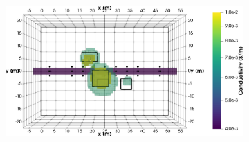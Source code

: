 \documentclass[preprint,authoryear,12pt]{elsarticle}
\begin{document}
\begin{figure}[htp]{}
\begin{center}
\begin{subfigure}{0.55\linewidth}
      \end{subfigure}
      \hspace{-4.0cm}
      \qquad
      \begin{subfigure}{0.55\linewidth}
         \includegraphics[trim=0cm 0cm 0cm 0cm, clip=true,width=\linewidth]{./figures/Fig24f.png}
      \end{subfigure}
      \vspace{0.2cm}


\end{center}
\end{figure}
\end{document}
